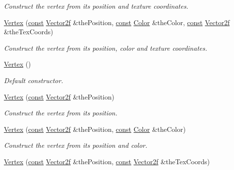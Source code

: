 \begin{DoxyCompactItemize}
\begin{DoxyCompactList}\small\item\em Construct the vertex from its position and texture coordinates. \end{DoxyCompactList}\item 
\hyperlink{classsf_1_1_vertex_ad5943f2b3cbc64b6e714bb37ccaf4960}{Vertex} (\hyperlink{term__entry_8h_a57bd63ce7f9a353488880e3de6692d5a}{const} \hyperlink{namespacesf_a80cea3c46537294fd1d8d428566ad8b2}{Vector2f} \&the\-Position, \hyperlink{term__entry_8h_a57bd63ce7f9a353488880e3de6692d5a}{const} \hyperlink{classsf_1_1_color}{Color} \&the\-Color, \hyperlink{term__entry_8h_a57bd63ce7f9a353488880e3de6692d5a}{const} \hyperlink{namespacesf_a80cea3c46537294fd1d8d428566ad8b2}{Vector2f} \&the\-Tex\-Coords)
\begin{DoxyCompactList}\small\item\em Construct the vertex from its position, color and texture coordinates. \end{DoxyCompactList}\item 
\hyperlink{classsf_1_1_vertex_a6b4c79cd69f7ec1296fede536f39e9c8}{Vertex} ()
\begin{DoxyCompactList}\small\item\em Default constructor. \end{DoxyCompactList}\item 
\hyperlink{classsf_1_1_vertex_a4dccc5c351b73b6fac169fe442535b40}{Vertex} (\hyperlink{term__entry_8h_a57bd63ce7f9a353488880e3de6692d5a}{const} \hyperlink{namespacesf_a80cea3c46537294fd1d8d428566ad8b2}{Vector2f} \&the\-Position)
\begin{DoxyCompactList}\small\item\em Construct the vertex from its position. \end{DoxyCompactList}\item 
\hyperlink{classsf_1_1_vertex_a70b0679b4ec531d5bd1a7d0225c7321a}{Vertex} (\hyperlink{term__entry_8h_a57bd63ce7f9a353488880e3de6692d5a}{const} \hyperlink{namespacesf_a80cea3c46537294fd1d8d428566ad8b2}{Vector2f} \&the\-Position, \hyperlink{term__entry_8h_a57bd63ce7f9a353488880e3de6692d5a}{const} \hyperlink{classsf_1_1_color}{Color} \&the\-Color)
\begin{DoxyCompactList}\small\item\em Construct the vertex from its position and color. \end{DoxyCompactList}\item 
\hyperlink{classsf_1_1_vertex_ab9bf849c4c0d82d09bf5bece23d2456a}{Vertex} (\hyperlink{term__entry_8h_a57bd63ce7f9a353488880e3de6692d5a}{const} \hyperlink{namespacesf_a80cea3c46537294fd1d8d428566ad8b2}{Vector2f} \&the\-Position, \hyperlink{term__entry_8h_a57bd63ce7f9a353488880e3de6692d5a}{const} \hyperlink{namespacesf_a80cea3c46537294fd1d8d428566ad8b2}{Vector2f} \&the\-Tex\-Coords)

\end{DoxyCompactItemize}
